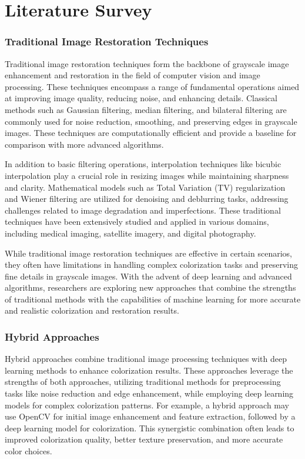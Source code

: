 \chapter{Literature Survey}

\subsection*{Traditional Image Restoration Techniques}

Traditional image restoration techniques form the backbone of grayscale image enhancement and restoration in the field of computer vision and image processing. These techniques encompass a range of fundamental operations aimed at improving image quality, reducing noise, and enhancing details. Classical methods such as Gaussian filtering, median filtering, and bilateral filtering are commonly used for noise reduction, smoothing, and preserving edges in grayscale images. These techniques are computationally efficient and provide a baseline for comparison with more advanced algorithms.

In addition to basic filtering operations, interpolation techniques like bicubic interpolation play a crucial role in resizing images while maintaining sharpness and clarity. Mathematical models such as Total Variation (TV) regularization and Wiener filtering are utilized for denoising and deblurring tasks, addressing challenges related to image degradation and imperfections. These traditional techniques have been extensively studied and applied in various domains, including medical imaging, satellite imagery, and digital photography.

While traditional image restoration techniques are effective in certain scenarios, they often have limitations in handling complex colorization tasks and preserving fine details in grayscale images. With the advent of deep learning and advanced algorithms, researchers are exploring new approaches that combine the strengths of traditional methods with the capabilities of machine learning for more accurate and realistic colorization and restoration results.

\subsection*{Hybrid Approaches}

Hybrid approaches combine traditional image processing techniques with deep learning methods to enhance colorization results. These approaches leverage the strengths of both approaches, utilizing traditional methods for preprocessing tasks like noise reduction and edge enhancement, while employing deep learning models for complex colorization patterns. For example, a hybrid approach may use OpenCV for initial image enhancement and feature extraction, followed by a deep learning model for colorization. This synergistic combination often leads to improved colorization quality, better texture preservation, and more accurate color choices.


